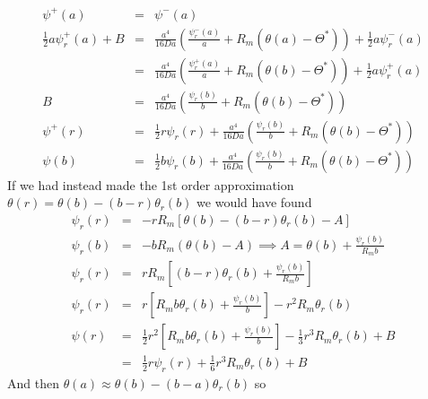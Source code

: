 \documentclass{article}
\begin{document}
\begin{eqnarray}
\psi^+(a) &=& \psi^-(a) \\
\frac{1}{2} a \psi^+_r (a) + B &=& \frac{a^4}{16 Da} \left(\frac{\psi^-_r(a)}{a} + R_m (\theta(a) - \Theta^*) \right)   + \frac{1}{2} a \psi^-_r(a) \\
&=& \frac{a^4}{16 Da} \left(\frac{\psi^+_r(a)}{a} + R_m (\theta(b) - \Theta^*) \right)   + \frac{1}{2} a \psi^+_r(a) \\
B &=& \frac{a^4}{16 Da} \left(\frac{\psi_r(b)}{b} + R_m (\theta(b) - \Theta^*) \right) \\
\psi^+(r) &=& \frac{1}{2} r \psi_r (r) + \frac{a^4}{16 Da} \left(\frac{\psi_r(b)}{b} + R_m (\theta(b) - \Theta^*) \right) \\
\psi(b) &=&\frac{1}{2} b \psi_r (b) + \frac{a^4}{16 Da} \left(\frac{\psi_r(b)}{b} + R_m (\theta(b) - \Theta^*) \right) 
\end{eqnarray}
If we had instead made the 1st order approximation $\theta(r)=\theta(b)-(b-r)\theta_r(b)$ we would have found
\begin{eqnarray}
\psi_r(r) &=& - r R_m \left[ \theta(b)-(b-r)\theta_r(b) - A \right] \\
\psi_r(b) &=& - b R_m (\theta(b) - A) \implies A = \theta(b) + \frac{\psi_r(b)}{R_m b} \\
\psi_r(r) &=&  r  R_m \left[ (b-r)\theta_r(b)   +  \frac{\psi_r(b)}{R_m b} \right] \\
\psi_r(r) &=& r \left[ R_m b \theta_r(b) + \frac{\psi_r(b)}{b} \right]  - r^2 R_m \theta_r(b) \\
\psi(r) &=& \frac{1}{2} r^2 \left[ R_m b \theta_r(b) + \frac{\psi_r(b)}{b} \right] - \frac{1}{3} r^3 R_m \theta_r(b) + B \\
&=& \frac{1}{2} r \psi_r(r) + \frac{1}{6} r^3 R_m \theta_r(b) + B
\end{eqnarray}
And then $\theta(a) \approx \theta(b) - (b-a) \theta_r(b)$ so
\end{document}
